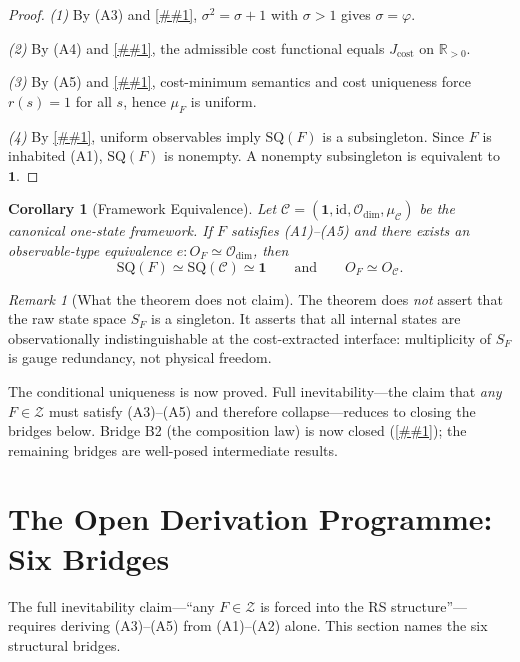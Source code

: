 \documentclass[11pt]{article}
\providecommand{\cref}[1]{\ref{##1}}%
\newcommand{\Rp}{\mathbb{R}_{>0}}
\newcommand{\Jcost}{J_{\mathrm{cost}}}
\newcommand{\SQ}{\mathrm{SQ}}
\newcommand{\cZ}{\mathcal{Z}}
\newcommand{\Odim}{\mathcal{O}_{\mathrm{dim}}}
\newtheorem{corollary}[theorem]{Corollary}
\theoremstyle{definition}
\theoremstyle{remark}
\newtheorem{remark}[theorem]{Remark}
\begin{document}
\begin{proof}
\emph{(1)}
By (A3) and \cref{thm:phi}, $\sigma^2 = \sigma + 1$ with
$\sigma > 1$ gives $\sigma = \varphi$.

\emph{(2)}
By (A4) and \cref{thm:t5}, the admissible cost functional
equals $\Jcost$ on $\Rp$.

\emph{(3)}
By (A5) and \cref{thm:derived-uniform}, cost-minimum semantics
and cost uniqueness force $r(s) = 1$ for all $s$, hence
$\mu_F$ is uniform.

\emph{(4)}
By \cref{lem:uniform-collapse}, uniform observables imply
$\SQ(F)$ is a subsingleton.
Since $F$ is inhabited (A1), $\SQ(F)$ is nonempty.
A nonempty subsingleton is equivalent to $\mathbf{1}$.
\end{proof}

\begin{corollary}[Framework Equivalence]\label{cor:equiv}
Let $\mathcal{C} = (\mathbf{1}, \mathrm{id}, \Odim, \mu_\mathcal{C})$
be the canonical one-state framework.
If $F$ satisfies \textup{(A1)--(A5)} and there exists an
observable-type equivalence $e : O_F \simeq \Odim$, then
\[
\SQ(F) \simeq \SQ(\mathcal{C}) \simeq \mathbf{1}
\qquad\text{and}\qquad
O_F \simeq O_\mathcal{C}.
\]
\end{corollary}

\begin{remark}[What the theorem does not claim]
The theorem does \emph{not} assert that the raw state space
$S_F$ is a singleton.
It asserts that all internal states are observationally
indistinguishable at the cost-extracted interface:
multiplicity of $S_F$ is gauge redundancy, not physical freedom.
\end{remark}

\medskip
The conditional uniqueness is now proved.
Full inevitability---the claim that \emph{any} $F \in \cZ$ must
satisfy (A3)--(A5) and therefore collapse---reduces to closing
the bridges below.
Bridge B2 (the composition law) is now closed
(\cref{thm:b2-closure}); the remaining bridges are well-posed
intermediate results.

\section{The Open Derivation Programme: Six Bridges}
\label{sec:bridges}

The full inevitability claim---``any $F \in \cZ$ is forced into
the RS structure''---requires deriving (A3)--(A5) from
(A1)--(A2) alone.
This section names the six structural bridges.
\end{document}
